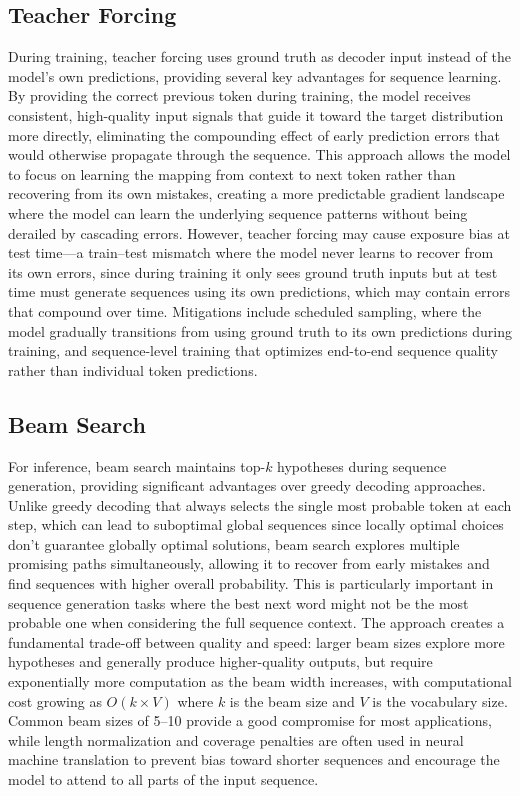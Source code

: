 \subsection{Teacher Forcing}

During training, teacher forcing uses ground truth as decoder input instead of the model's own predictions, providing several key advantages for sequence learning. By providing the correct previous token during training, the model receives consistent, high-quality input signals that guide it toward the target distribution more directly, eliminating the compounding effect of early prediction errors that would otherwise propagate through the sequence. This approach allows the model to focus on learning the mapping from context to next token rather than recovering from its own mistakes, creating a more predictable gradient landscape where the model can learn the underlying sequence patterns without being derailed by cascading errors. However, teacher forcing may cause exposure bias at test time—a train–test mismatch where the model never learns to recover from its own errors, since during training it only sees ground truth inputs but at test time must generate sequences using its own predictions, which may contain errors that compound over time. Mitigations include scheduled sampling, where the model gradually transitions from using ground truth to its own predictions during training, and sequence-level training that optimizes end-to-end sequence quality rather than individual token predictions.

\subsection{Beam Search}

For inference, beam search maintains top-$k$ hypotheses during sequence generation, providing significant advantages over greedy decoding approaches. Unlike greedy decoding that always selects the single most probable token at each step, which can lead to suboptimal global sequences since locally optimal choices don't guarantee globally optimal solutions, beam search explores multiple promising paths simultaneously, allowing it to recover from early mistakes and find sequences with higher overall probability. This is particularly important in sequence generation tasks where the best next word might not be the most probable one when considering the full sequence context. The approach creates a fundamental trade-off between quality and speed: larger beam sizes explore more hypotheses and generally produce higher-quality outputs, but require exponentially more computation as the beam width increases, with computational cost growing as $O(k \times V)$ where $k$ is the beam size and $V$ is the vocabulary size. Common beam sizes of 5–10 provide a good compromise for most applications, while length normalization and coverage penalties are often used in neural machine translation to prevent bias toward shorter sequences and encourage the model to attend to all parts of the input sequence.
